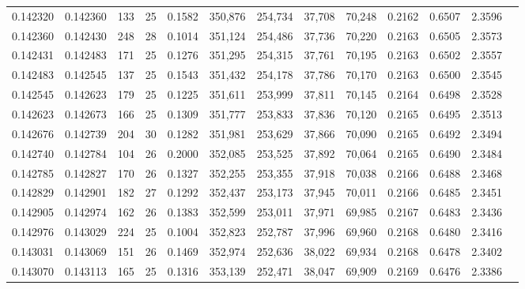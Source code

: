\begin{tabular}{rrrrrrrrrrrrr}
0.142320 & 0.142360 & 133 &  25 &                                     0.1582 & 350,876 & 254,734 &  37,708 &  70,248 & 0.2162 & 0.6507 & 2.3596 \\
0.142360 & 0.142430 & 248 &  28 &                                     0.1014 & 351,124 & 254,486 &  37,736 &  70,220 & 0.2163 & 0.6505 & 2.3573 \\
0.142431 & 0.142483 & 171 &  25 &                                     0.1276 & 351,295 & 254,315 &  37,761 &  70,195 & 0.2163 & 0.6502 & 2.3557 \\
0.142483 & 0.142545 & 137 &  25 &                                     0.1543 & 351,432 & 254,178 &  37,786 &  70,170 & 0.2163 & 0.6500 & 2.3545 \\
0.142545 & 0.142623 & 179 &  25 &                                     0.1225 & 351,611 & 253,999 &  37,811 &  70,145 & 0.2164 & 0.6498 & 2.3528 \\
0.142623 & 0.142673 & 166 &  25 &                                     0.1309 & 351,777 & 253,833 &  37,836 &  70,120 & 0.2165 & 0.6495 & 2.3513 \\
0.142676 & 0.142739 & 204 &  30 &                                     0.1282 & 351,981 & 253,629 &  37,866 &  70,090 & 0.2165 & 0.6492 & 2.3494 \\
0.142740 & 0.142784 & 104 &  26 &                                     0.2000 & 352,085 & 253,525 &  37,892 &  70,064 & 0.2165 & 0.6490 & 2.3484 \\
0.142785 & 0.142827 & 170 &  26 &                                     0.1327 & 352,255 & 253,355 &  37,918 &  70,038 & 0.2166 & 0.6488 & 2.3468 \\
0.142829 & 0.142901 & 182 &  27 &                                     0.1292 & 352,437 & 253,173 &  37,945 &  70,011 & 0.2166 & 0.6485 & 2.3451 \\
0.142905 & 0.142974 & 162 &  26 &                                     0.1383 & 352,599 & 253,011 &  37,971 &  69,985 & 0.2167 & 0.6483 & 2.3436 \\
0.142976 & 0.143029 & 224 &  25 &                                     0.1004 & 352,823 & 252,787 &  37,996 &  69,960 & 0.2168 & 0.6480 & 2.3416 \\
0.143031 & 0.143069 & 151 &  26 &                                     0.1469 & 352,974 & 252,636 &  38,022 &  69,934 & 0.2168 & 0.6478 & 2.3402 \\
0.143070 & 0.143113 & 165 &  25 &                                     0.1316 & 353,139 & 252,471 &  38,047 &  69,909 & 0.2169 & 0.6476 & 2.3386 \\

\end{tabular}
